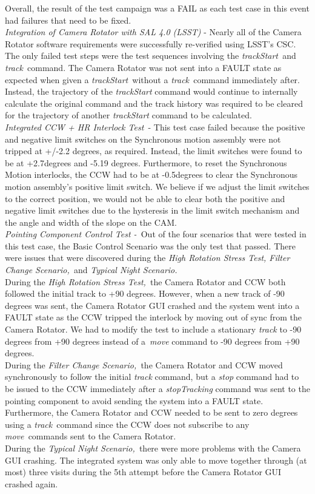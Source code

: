 \documentclass[SE,STR,toc]{lsstdoc}
\begin{document}
 Overall, the result of the test campaign was a FAIL as each test case in
this event had failures that need to be
fixed.\\[2\baselineskip]\emph{Integration of Camera Rotator with SAL 4.0
(LSST)} - Nearly all of the Camera Rotator software requirements were
successfully re-verified using LSST's CSC. The only failed test steps
were the test sequences involving the \emph{trackStart~}and
\emph{track~}command. The Camera Rotator was not sent into a FAULT state
as expected when given a \emph{trackStart~}without a
\emph{track~}command immediately after. Instead, the trajectory of the
\emph{trackStart} command would continue to internally calculate the
original command and the track history was required to be cleared for
the trajectory of another \emph{trackStart} command to be
calculated.\\[2\baselineskip]\emph{Integrated CCW + HR Interlock Test~}-
This test case failed because the positive and negative limit switches
on the Synchronous motion assembly were not tripped at +/-2.2 degrees,
as required. Instead, the limit switches were found to be at +2.7degrees
and -5.19 degrees. Furthermore, to reset the Synchronous Motion
interlocks, the CCW had to be at -0.5degrees to clear the Synchronous
motion assembly's positive limit switch. We believe if we adjust the
limit switches to the correct position, we would not be able to clear
both the positive and negative limit switches due to the hysteresis in
the limit switch mechanism and the angle and width of the slope on the
CAM.\\[2\baselineskip]\emph{Pointing Component Control Test -~}Out of
the four scenarios that were tested in this test case, the Basic Control
Scenario was the only test that passed. There were issues that were
discovered during the \emph{High Rotation Stress Test, Filter Change
Scenario,~}and \emph{Typical Night Scenario.}\\
During the \emph{High Rotation Stress Test,~}the Camera Rotator and CCW
both followed the initial track to +90 degrees. However, when a new
track of -90 degrees was sent, the Camera Rotator GUI crashed and the
system went into a FAULT state as the CCW tripped the interlock by
moving out of sync from the Camera Rotator. We had to modify the test to
include a stationary \emph{track} to -90 degrees from +90 degrees
instead of a~\emph{move} command to -90 degrees from +90 degrees.\\
During the \emph{Filter Change Scenario,~}the Camera Rotator and CCW
moved synchronously to follow the initial \emph{track} command, but a
\emph{stop} command had to be issued to the CCW immediately after a
\emph{stopTracking} command was sent to the pointing component to avoid
sending the system into a FAULT state. Furthermore, the Camera Rotator
and CCW needed to be sent to zero degrees using a \emph{track~}command
since the CCW does not subscribe to any \emph{move~}commands sent to the
Camera Rotator.\\
During the \emph{Typical Night Scenario,~}there were more problems with
the Camera GUI crashing. The integrated system was only able to move
together through (at most) three visits during the 5th attempt before
the Camera Rotator GUI crashed again.~
\end{document}
